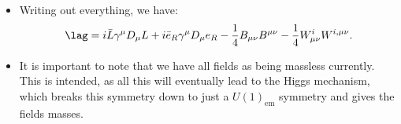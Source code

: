 \begin{itemize}
\begin{equation}
        \end{equation}
    \item Writing out everything, we have:
        \begin{equation}
            \lag = i\bar{L} \gamma^{\mu}D_{\mu} L + i\bar{e}_R \gamma^{\mu}D_{\mu} e_R - \frac{1}{4}B_{\mu\nu}B^{\mu\nu} - \frac{1}{4}W_{\mu\nu}^iW^{i,\mu\nu}.
        \end{equation}
    \item It is important to note that we have all fields as being massless currently. This is intended, as all this will eventually lead to the Higgs mechanism, which breaks this symmetry down to just a $U(1)_{\mathrm{em}}$ symmetry and gives the fields masses.
\end{itemize}
